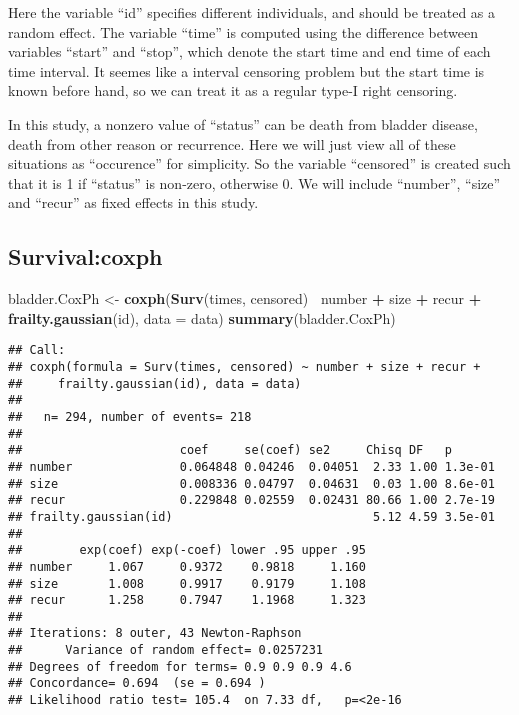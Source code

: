 \documentclass[]{article}
\newenvironment{Shaded}{\begin{snugshade}}{\end{snugshade}}
\newcommand{\DataTypeTok}[1]{\textcolor[rgb]{0.13,0.29,0.53}{#1}}
\newcommand{\KeywordTok}[1]{\textcolor[rgb]{0.13,0.29,0.53}{\textbf{#1}}}
\newcommand{\NormalTok}[1]{#1}
\newcommand{\OperatorTok}[1]{\textcolor[rgb]{0.81,0.36,0.00}{\textbf{#1}}}
\newcommand{\StringTok}[1]{\textcolor[rgb]{0.31,0.60,0.02}{#1}}
\begin{document}
Here the variable ``id'' specifies different individuals, and should be
treated as a random effect. The variable ``time'' is computed using the
difference between variables ``start'' and ``stop'', which denote the
start time and end time of each time interval. It seemes like a interval
censoring problem but the start time is known before hand, so we can
treat it as a regular type-I right censoring.

In this study, a nonzero value of ``status'' can be death from bladder
disease, death from other reason or recurrence. Here we will just view
all of these situations as ``occurence'' for simplicity. So the variable
``censored'' is created such that it is 1 if ``status'' is non-zero,
otherwise 0. We will include ``number'', ``size'' and ``recur'' as fixed
effects in this study.

\hypertarget{survivalcoxph}{%
\subsection{Survival:coxph}\label{survivalcoxph}}

\begin{Shaded}
\begin{Highlighting}[]
\NormalTok{bladder.CoxPh <-}\StringTok{ }\KeywordTok{coxph}\NormalTok{(}\KeywordTok{Surv}\NormalTok{(times, censored)}\OperatorTok{~}\StringTok{ }\NormalTok{number }\OperatorTok{+}\StringTok{ }\NormalTok{size }\OperatorTok{+}\StringTok{ }\NormalTok{recur }\OperatorTok{+}\StringTok{ }\KeywordTok{frailty.gaussian}\NormalTok{(id), }\DataTypeTok{data =}\NormalTok{ data)}
\KeywordTok{summary}\NormalTok{(bladder.CoxPh)}
\end{Highlighting}
\end{Shaded}

\begin{verbatim}
## Call:
## coxph(formula = Surv(times, censored) ~ number + size + recur + 
##     frailty.gaussian(id), data = data)
## 
##   n= 294, number of events= 218 
## 
##                      coef     se(coef) se2     Chisq DF   p      
## number               0.064848 0.04246  0.04051  2.33 1.00 1.3e-01
## size                 0.008336 0.04797  0.04631  0.03 1.00 8.6e-01
## recur                0.229848 0.02559  0.02431 80.66 1.00 2.7e-19
## frailty.gaussian(id)                            5.12 4.59 3.5e-01
## 
##        exp(coef) exp(-coef) lower .95 upper .95
## number     1.067     0.9372    0.9818     1.160
## size       1.008     0.9917    0.9179     1.108
## recur      1.258     0.7947    1.1968     1.323
## 
## Iterations: 8 outer, 43 Newton-Raphson
##      Variance of random effect= 0.0257231 
## Degrees of freedom for terms= 0.9 0.9 0.9 4.6 
## Concordance= 0.694  (se = 0.694 )
## Likelihood ratio test= 105.4  on 7.33 df,   p=<2e-16
\end{verbatim}
\end{document}
